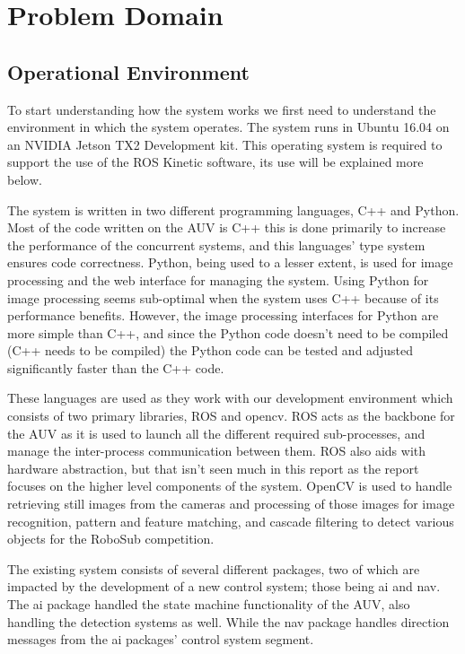 \chapter{Problem Domain}

\label{Chapter2}

\section{Operational Environment}

To start understanding how the system works we first need to understand the
environment in which the system operates.
The system runs in Ubuntu 16.04 on an NVIDIA Jetson TX2 Development kit.
This operating system is required to support the use of the \gls{ROS} Kinetic
software, its use will be explained more below.

The system is written in two different programming languages, C++ and Python.
Most of the code written on the AUV is C++ this is done primarily to increase
the performance of the concurrent systems, and this languages' type system
ensures code correctness.
Python, being used to a lesser extent, is used for image processing and the web
interface for managing the system.
Using Python for image processing seems sub-optimal when the system uses C++
because of its performance benefits.
However, the image processing interfaces for Python are more simple than C++,
and since the Python code doesn't need to be compiled (C++ needs to be compiled)
the Python code can be tested and adjusted significantly faster than the C++
code.

These languages are used as they work with our development environment which
consists of two primary libraries, \gls{ROS} and \gls{opencv}.
ROS acts as the backbone for the AUV as it is used to launch all the different
required sub-processes, and manage the inter-process communication between them.
ROS also aids with hardware abstraction, but that isn't seen much in this
report as the report focuses on the higher level components of the system.
OpenCV is used to handle retrieving still images from the cameras and processing
of those images for image recognition, pattern and feature matching, and cascade
filtering to detect various objects for the RoboSub competition.

The existing system consists of several different packages, two of which are
impacted by the development of a new control system; those being ai and nav.
The ai package handled the state machine functionality of the AUV, also handling
the detection systems as well. While the nav package handles direction messages
from the ai packages' control system segment.

